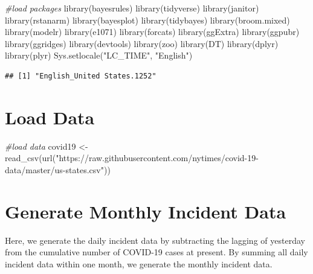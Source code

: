 \documentclass[
]{book}
\newenvironment{Shaded}{\begin{snugshade}}{\end{snugshade}}
\newcommand{\CommentTok}[1]{\textcolor[rgb]{0.56,0.35,0.01}{\textit{#1}}}
\newcommand{\FunctionTok}[1]{\textcolor[rgb]{0.00,0.00,0.00}{#1}}
\newcommand{\NormalTok}[1]{#1}
\newcommand{\OtherTok}[1]{\textcolor[rgb]{0.56,0.35,0.01}{#1}}
\newcommand{\StringTok}[1]{\textcolor[rgb]{0.31,0.60,0.02}{#1}}
\begin{document}
\begin{Shaded}
\begin{Highlighting}[]
\CommentTok{\#load packages}
\FunctionTok{library}\NormalTok{(bayesrules)}
\FunctionTok{library}\NormalTok{(tidyverse)}
\FunctionTok{library}\NormalTok{(janitor)}
\FunctionTok{library}\NormalTok{(rstanarm)}
\FunctionTok{library}\NormalTok{(bayesplot)}
\FunctionTok{library}\NormalTok{(tidybayes)}
\FunctionTok{library}\NormalTok{(broom.mixed)}
\FunctionTok{library}\NormalTok{(modelr)}
\FunctionTok{library}\NormalTok{(e1071)}
\FunctionTok{library}\NormalTok{(forcats)}
\FunctionTok{library}\NormalTok{(ggExtra)}
\FunctionTok{library}\NormalTok{(ggpubr)}
\FunctionTok{library}\NormalTok{(ggridges)}
\FunctionTok{library}\NormalTok{(devtools)}
\FunctionTok{library}\NormalTok{(zoo)}
\FunctionTok{library}\NormalTok{(DT)}
\FunctionTok{library}\NormalTok{(dplyr)}
\FunctionTok{library}\NormalTok{(plyr)}
\FunctionTok{Sys.setlocale}\NormalTok{(}\StringTok{"LC\_TIME"}\NormalTok{, }\StringTok{"English"}\NormalTok{)}
\end{Highlighting}
\end{Shaded}

\begin{verbatim}
## [1] "English_United States.1252"
\end{verbatim}

\hypertarget{load-data}{%
\section{Load Data}\label{load-data}}

\begin{Shaded}
\begin{Highlighting}[]
\CommentTok{\#load data}
\NormalTok{covid19 }\OtherTok{\textless{}{-}} \FunctionTok{read\_csv}\NormalTok{(}\FunctionTok{url}\NormalTok{(}\StringTok{"https://raw.githubusercontent.com/nytimes/covid{-}19{-}data/master/us{-}states.csv"}\NormalTok{))}
\end{Highlighting}
\end{Shaded}

\hypertarget{generate-monthly-incident-data}{%
\section{Generate Monthly Incident Data}\label{generate-monthly-incident-data}}

Here, we generate the daily incident data by subtracting the lagging of yesterday from the cumulative number of COVID-19 cases at present. By summing all daily incident data within one month, we generate the monthly incident data.
\end{document}
